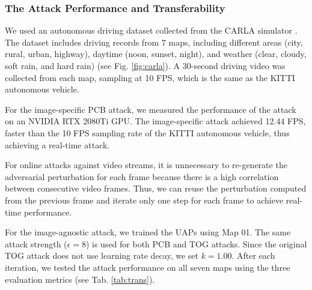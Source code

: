 

\subsubsection{The Attack Performance and Transferability}

We used an autonomous driving dataset collected from the CARLA simulator \cite{deschaud2021kitticarla}. The dataset includes driving records from 7 maps, including different areas (city, rural, urban, highway), daytime (noon, sunset, night), and weather (clear, cloudy, soft rain, and hard rain) (see Fig. \ref{fig:carla}). A 30-second driving video was collected from each map, sampling at 10 FPS, which is the same as the KITTI autonomous vehicle. 

For the image-specific PCB attack, we measured the performance of the attack on an NVIDIA RTX 2080Ti GPU. The image-specific attack achieved 12.44 FPS, faster than the 10 FPS sampling rate of the KITTI autonomous vehicle, thus achieving a real-time attack.

For online attacks against video streams, it is unnecessary to re-generate the adversarial perturbation for each frame because there is a high correlation between consecutive video frames. Thus, we can reuse the perturbation computed from the previous frame and iterate only one step for each frame to achieve real-time performance. 


For the image-agnostic attack, we trained the UAPs using Map 01. The same attack strength ($\epsilon=8$) is used for both PCB and TOG attacks. Since the original TOG attack does not use learning rate decay, we set $k=1.00$. After each iteration, we tested the attack performance on all seven maps using the three evaluation metrics (see Tab. \ref{tab:trans}).

